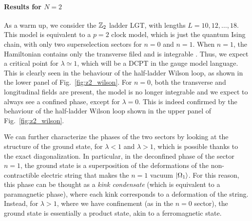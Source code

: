 \smallskip

%     



\paragraph{Results for \texorpdfstring{$N=2$}{N=2}}
As a warm up, we consider the $\mathbb{Z}_2$ ladder LGT, with lengths $L=10,12,\dots,18$.
This model is equivalent to a $p=2$ clock model, which is just the quantum Ising chain, with only two superselection sectors for $n=0$ and $n=1$.
When $n=1$, the Hamiltonian  contains only the transverse filed and is integrable \cite{baxter1982exactlysm}.
Thus, we expect a critical point for $\lambda \simeq 1$, which will be a DCPT in the gauge model language.
This is clearly seen in the behaviour of the half-ladder Wilson loop, as shown in the lower panel of Fig.~\ref{fig:z2_wilson}.
For $n=0$, both the transverse and longitudinal fields  are present, the model is no longer integrable  \cite{banuls2011thermalization, kormos2017confinement, pomponio2022bloch} and we expect to always see a confined phase, except for $\lambda = 0$.
This is indeed confirmed by the behaviour of the half-ladder Wilson loop shown in the upper panel of Fig.~\ref{fig:z2_wilson}.

We can further characterize the phases of the two sectors by looking at the structure of the ground state, for $\lambda<1$ and $\lambda>1$, which is possible thanks to the exact diagonalization.
In particular, in the deconfined phase of the sector $n=1$, the ground state is a superposition of the deformations of the non-contractible electric string that makes the $n=1$ vacuum $\ket{\Omega_1}$.
For this reason, this phase can be thought as a \emph{kink condensate} \cite{fradkin1978order} (which is equivalent to a paramagnetic phase), where each kink corresponds to a deformation of the string.
Instead, for $\lambda > 1$, where we have confinement (as in the $n=0$ sector), the ground state is essentially a product state, akin to a ferromagnetic state. %


